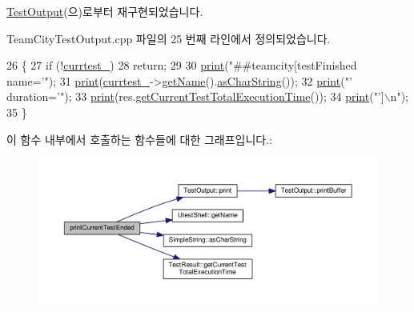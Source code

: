 \hyperlink{class_test_output_a67acd3c53695126b4728c7da0d2b0b51}{Test\+Output}(으)로부터 재구현되었습니다.



Team\+City\+Test\+Output.\+cpp 파일의 25 번째 라인에서 정의되었습니다.


\begin{DoxyCode}
26 \{
27     \textcolor{keywordflow}{if} (!\hyperlink{class_team_city_test_output_a5dc621283d75466dfdb5169ca66eb571}{currtest\_})
28         \textcolor{keywordflow}{return};
29 
30     \hyperlink{class_test_output_a321b5c489a90374cb61c34fe5d2253ef}{print}(\textcolor{stringliteral}{"##teamcity[testFinished name='"});
31     \hyperlink{class_test_output_a321b5c489a90374cb61c34fe5d2253ef}{print}(\hyperlink{class_team_city_test_output_a5dc621283d75466dfdb5169ca66eb571}{currtest\_}->\hyperlink{class_utest_shell_a454500e4f7023136a9a6a956323e3a77}{getName}().\hyperlink{class_simple_string_af7c0efaf31f42553f05719903c830be1}{asCharString}());
32     \hyperlink{class_test_output_a321b5c489a90374cb61c34fe5d2253ef}{print}(\textcolor{stringliteral}{"' duration='"});
33     \hyperlink{class_test_output_a321b5c489a90374cb61c34fe5d2253ef}{print}(res.\hyperlink{class_test_result_a3c06bb4516065fd2ba57231e246002e9}{getCurrentTestTotalExecutionTime}());
34     \hyperlink{class_test_output_a321b5c489a90374cb61c34fe5d2253ef}{print}(\textcolor{stringliteral}{"']\(\backslash\)n"});
35 \}
\end{DoxyCode}


이 함수 내부에서 호출하는 함수들에 대한 그래프입니다.\+:
\nopagebreak
\begin{figure}[H]
\begin{center}
\leavevmode
\includegraphics[width=350pt]{class_team_city_test_output_a03ceb1aab29f845f5d0a6e5bb4124885_cgraph}
\end{center}
\end{figure}


